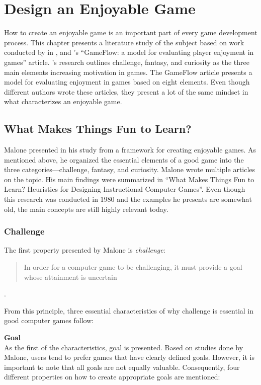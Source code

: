 \documentclass[../Main.tex]{subfiles}
\begin{document}
\section{Design an Enjoyable Game}
\label{chap:designanenjoyable}

How to create an enjoyable game is an important part of every game development process. This chapter presents a literature study of the subject based on work conducted by \citeauthor{malone_what_1980} in \citeyear{malone_what_1980}, and \citeauthor{sweetser_gameflow_2005}’s “GameFlow: a model for evaluating player enjoyment in games” article. \citeauthor{malone_what_1980}’s research outlines challenge, fantasy, and curiosity as the three main elements increasing motivation in games. The GameFlow article presents a model for evaluating enjoyment in games based on eight elements. Even though different authors wrote these articles, they present a lot of the same mindset in what characterizes an enjoyable game.

\subsection{What Makes Things Fun to Learn?}
Malone presented in his study from \citeyear{malone_what_1980} a framework for creating enjoyable games. As mentioned above, he organized the essential elements of a good game into the three categories—challenge, fantasy, and curiosity. Malone wrote multiple articles on the topic. His main findings were summarized in “What Makes Things Fun to Learn? Heuristics for Designing Instructional Computer Games”. Even though this research was conducted in 1980 and the examples he presents are somewhat old, the main concepts are still highly relevant today.

\subsubsection{Challenge}
The first property presented by Malone is \textit{challenge}:

\blockquote{In order for a computer game to be challenging, it must provide a goal whose attainment is uncertain} \citep{malone_what_1980}. 

From this principle, three essential characteristics of why challenge is essential in good computer games follow:

\textbf{Goal} \\
As the first of the characteristics, goal is presented. Based on studies done by Malone, users tend to prefer games that have clearly defined goals. However, it is important to note that all goals are not equally valuable. Consequently, four different properties on how to create appropriate goals are mentioned:
\end{document}
